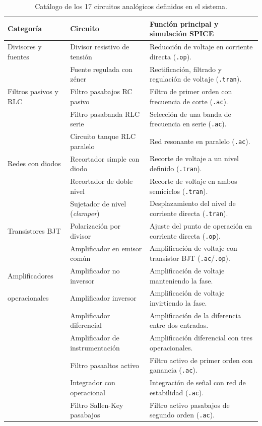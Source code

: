 \begin{table}[H]
\centering
\caption{Catálogo de los 17 circuitos analógicos definidos en el sistema.}
\label{tab:catalogo-topologias}
\footnotesize
\begin{tabularx}{\textwidth}{@{}llX@{}}
\toprule
\textbf{Categoría} & \textbf{Circuito} & \textbf{Función principal y simulación SPICE} \\
\midrule
Divisores y fuentes & Divisor resistivo de tensión & Reducción de voltaje en corriente directa (\texttt{.op}). \\
 & Fuente regulada con zéner & Rectificación, filtrado y regulación de voltaje (\texttt{.tran}). \\[4pt]
Filtros pasivos y RLC & Filtro pasabajos RC pasivo & Filtro de primer orden con frecuencia de corte (\texttt{.ac}). \\
 & Filtro pasabanda RLC serie & Selección de una banda de frecuencia en serie (\texttt{.ac}). \\
 & Circuito tanque RLC paralelo & Red resonante en paralelo (\texttt{.ac}). \\[4pt]
Redes con diodos & Recortador simple con diodo & Recorte de voltaje a un nivel definido (\texttt{.tran}). \\
 & Recortador de doble nivel & Recorte de voltaje en ambos semiciclos (\texttt{.tran}). \\
 & Sujetador de nivel (\textit{clamper}) & Desplazamiento del nivel de corriente directa (\texttt{.tran}). \\[4pt]
Transistores BJT & Polarización por divisor & Ajuste del punto de operación en corriente directa (\texttt{.op}). \\
 & Amplificador en emisor común & Amplificación de voltaje con transistor BJT (\texttt{.ac}/\texttt{.op}). \\[4pt]
Amplificadores & Amplificador no inversor & Amplificación de voltaje manteniendo la fase. \\
operacionales & Amplificador inversor & Amplificación de voltaje invirtiendo la fase. \\
 & Amplificador diferencial & Amplificación de la diferencia entre dos entradas. \\
 & Amplificador de instrumentación & Amplificación diferencial con tres operacionales. \\
 & Filtro pasaaltos activo & Filtro activo de primer orden con ganancia (\texttt{.ac}). \\
 & Integrador con operacional & Integración de señal con red de estabilidad (\texttt{.ac}). \\
 & Filtro Sallen-Key pasabajos & Filtro activo pasabajos de segundo orden (\texttt{.ac}). \\
\bottomrule
\end{tabularx}
\end{table}

